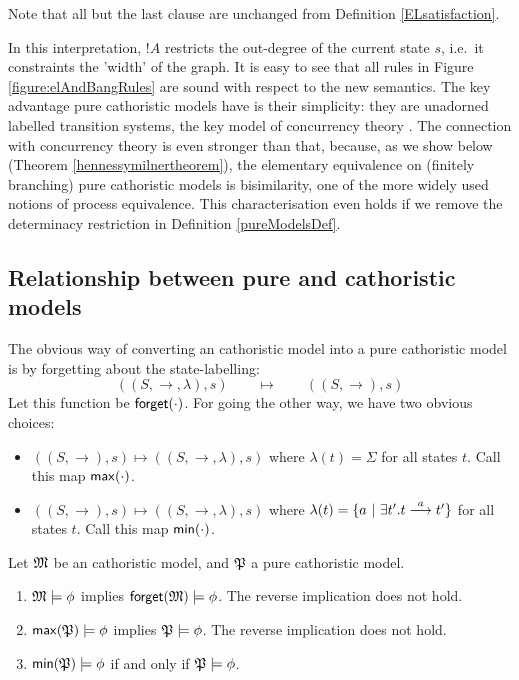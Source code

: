 \NI Note that all but the last clause are unchanged from Definition
\ref{ELsatisfaction}.

In this interpretation, $!A$ restricts the out-degree of the current
state $s$, i.e.~it constraints the 'width' of the graph.  It is easy
to see that all rules in Figure \ref{figure:elAndBangRules} are sound
with respect to the new semantics.  The key advantage pure cathoristic
models have is their simplicity: they are unadorned labelled
transition systems, the key model of concurrency theory
\cite{SassoneV:modcontac}. The connection with concurrency theory is
even stronger than that, because, as we show below (Theorem
\ref{hennessymilnertheorem}), the elementary equivalence on (finitely
branching) pure cathoristic models is bisimilarity, one of the more
widely used notions of process equivalence. This characterisation even
holds if we remove the determinacy restriction in Definition \ref{pureModelsDef}.

\subsection{Relationship between pure and cathoristic models}

The obvious way of converting an cathoristic model into a pure cathoristic model
is by forgetting about the state-labelling:
\[
   ((S, \rightarrow, \lambda), s ) \qquad\mapsto\qquad ((S, \rightarrow), s ) 
\]
Let this function be $\mathsf{forget}(\cdot)$. For going the other way, we
have two obvious choices:

\begin{itemize}

\item $((S, \rightarrow), s ) \mapsto ((S, \rightarrow, \lambda), s )$
  where $\lambda(t) = \Sigma$ for all states $t$. Call this map $\mathsf{max}(\cdot)$.

\item $((S, \rightarrow), s ) \mapsto ((S, \rightarrow, \lambda), s )$
  where $\lambda(t) = \{a \ |\ \exists t'. t \stackrel{a}{\longrightarrow} t'\}$ for all
  states $t$. Call this map $\mathsf{min}(\cdot)$.

\end{itemize}

\begin{lemma}\label{modelRelationships}
Let $\frak{M}$ be an cathoristic model, and $\frak{P}$ a pure cathoristic model.
\begin{enumerate}

\item\label{modelRelationships:1}  $\frak{M} \models \phi$ implies
  $\mathsf{forget}(\frak{M}) \models \phi$. The reverse implication does not hold.

\item\label{modelRelationships:2}  $ \mathsf{max}(\frak{P}) \models \phi$ implies
  $\frak{P} \models \phi$. The reverse implication does not hold.

\item\label{modelRelationships:3} $\mathsf{min}(\frak{P}) \models \phi$ if and only if
  $\frak{P} \models \phi$. 

\end{enumerate}
\end{lemma}

